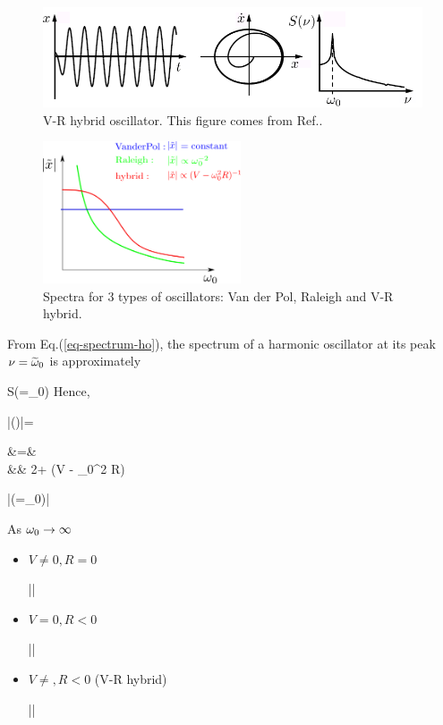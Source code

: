 \begin{figure}[h!]
\centering
\includegraphics[width=5in]
{dynamical-sys/hybrid-term.png}
\caption{V-R hybrid oscillator. This
 figure  comes from Ref.\cite{dynamical-fuchs}.}
\label{fig-hybrid-term}
\end{figure}


\begin{figure}[h!]
\centering
\includegraphics[width=2.3in]
{dynamical-sys/3-oscillator-spectra.png}
\caption{Spectra for 3 types of oscillators: Van der Pol, 
Raleigh and V-R hybrid.}
\label{fig-3-oscillator-spectra}
\end{figure}

From Eq.(\ref{eq-spectrum-ho}), the
spectrum of a harmonic oscillator at its peak 
$\nu={\widetilde{\omega}}_0$ is approximately

\beq
S(\nu=\TIL{\omega}_0)\approx {}
\eeq
Hence, 

\beq
|(\nu)|=
\approx {}
\eeq

\beqa
\av{2\TIL{\gamma}} &=&
\\
&\approx& 
2\gamma + (V  - \omega_0^2 R)
\eeqa

\beq
|(\nu=\omega_0)|\approx
{}
\eeq

As $\omega_0\rightarrow
\infty$
 
\begin{itemize}
\item $V\neq 0, R=0$

\beq
||\propto {}
\eeq

\item $V= 0, R< 0$

\beq
||\propto {}
\eeq

\item $V\neq, R< 0$ (V-R hybrid)

\beq
||\propto {}
\eeq



\end{itemize}



